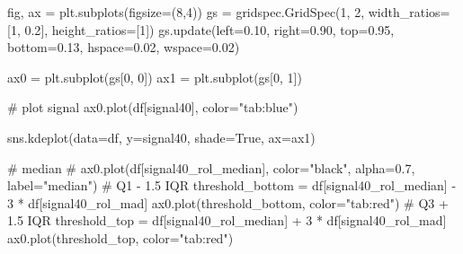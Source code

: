 \documentclass[
  letterpaper,
  DIV=11,
  numbers=noendperiod,
  oneside]{scrreprt}
\newenvironment{Shaded}{\begin{snugshade}}{\end{snugshade}}
\newcommand{\CommentTok}[1]{\textcolor[rgb]{0.37,0.37,0.37}{#1}}
\newcommand{\DecValTok}[1]{\textcolor[rgb]{0.68,0.00,0.00}{#1}}
\newcommand{\FloatTok}[1]{\textcolor[rgb]{0.68,0.00,0.00}{#1}}
\newcommand{\NormalTok}[1]{\textcolor[rgb]{0.00,0.23,0.31}{#1}}
\newcommand{\OperatorTok}[1]{\textcolor[rgb]{0.37,0.37,0.37}{#1}}
\newcommand{\StringTok}[1]{\textcolor[rgb]{0.13,0.47,0.30}{#1}}
\newcommand{\VariableTok}[1]{\textcolor[rgb]{0.07,0.07,0.07}{#1}}
\begin{document}
\begin{Shaded}
\begin{Highlighting}[]
\NormalTok{fig, ax }\OperatorTok{=}\NormalTok{ plt.subplots(figsize}\OperatorTok{=}\NormalTok{(}\DecValTok{8}\NormalTok{,}\DecValTok{4}\NormalTok{))}
\NormalTok{gs }\OperatorTok{=}\NormalTok{ gridspec.GridSpec(}\DecValTok{1}\NormalTok{, }\DecValTok{2}\NormalTok{, width\_ratios}\OperatorTok{=}\NormalTok{[}\DecValTok{1}\NormalTok{, }\FloatTok{0.2}\NormalTok{], height\_ratios}\OperatorTok{=}\NormalTok{[}\DecValTok{1}\NormalTok{])}
\NormalTok{gs.update(left}\OperatorTok{=}\FloatTok{0.10}\NormalTok{, right}\OperatorTok{=}\FloatTok{0.90}\NormalTok{, top}\OperatorTok{=}\FloatTok{0.95}\NormalTok{, bottom}\OperatorTok{=}\FloatTok{0.13}\NormalTok{,}
\NormalTok{          hspace}\OperatorTok{=}\FloatTok{0.02}\NormalTok{, wspace}\OperatorTok{=}\FloatTok{0.02}\NormalTok{)}

\NormalTok{ax0 }\OperatorTok{=}\NormalTok{ plt.subplot(gs[}\DecValTok{0}\NormalTok{, }\DecValTok{0}\NormalTok{])}
\NormalTok{ax1 }\OperatorTok{=}\NormalTok{ plt.subplot(gs[}\DecValTok{0}\NormalTok{, }\DecValTok{1}\NormalTok{])}

\CommentTok{\# plot signal}
\NormalTok{ax0.plot(df[}\StringTok{\textquotesingle{}signal40\textquotesingle{}}\NormalTok{], color}\OperatorTok{=}\StringTok{"tab:blue"}\NormalTok{)}

\NormalTok{sns.kdeplot(data}\OperatorTok{=}\NormalTok{df, y}\OperatorTok{=}\StringTok{\textquotesingle{}signal40\textquotesingle{}}\NormalTok{, shade}\OperatorTok{=}\VariableTok{True}\NormalTok{, ax}\OperatorTok{=}\NormalTok{ax1)}

\CommentTok{\# median}
\CommentTok{\# ax0.plot(df[\textquotesingle{}signal40\_rol\_median\textquotesingle{}], color="black", alpha=0.7, label="median")}
\CommentTok{\# Q1 {-} 1.5 IQR}
\NormalTok{threshold\_bottom }\OperatorTok{=}\NormalTok{ df[}\StringTok{\textquotesingle{}signal40\_rol\_median\textquotesingle{}}\NormalTok{] }\OperatorTok{{-}} \DecValTok{3} \OperatorTok{*}\NormalTok{ df[}\StringTok{\textquotesingle{}signal40\_rol\_mad\textquotesingle{}}\NormalTok{]}
\NormalTok{ax0.plot(threshold\_bottom, color}\OperatorTok{=}\StringTok{"tab:red"}\NormalTok{)}
\CommentTok{\# Q3 + 1.5 IQR}
\NormalTok{threshold\_top }\OperatorTok{=}\NormalTok{ df[}\StringTok{\textquotesingle{}signal40\_rol\_median\textquotesingle{}}\NormalTok{] }\OperatorTok{+} \DecValTok{3} \OperatorTok{*}\NormalTok{ df[}\StringTok{\textquotesingle{}signal40\_rol\_mad\textquotesingle{}}\NormalTok{]}
\NormalTok{ax0.plot(threshold\_top, color}\OperatorTok{=}\StringTok{"tab:red"}\NormalTok{)}


\end{Highlighting}
\end{Shaded}
\end{document}
